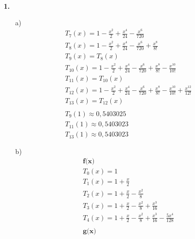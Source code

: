 \documentclass[a4paper,11pt]{article}
\title{\titleinfo}
\author{\authorinfotitle}
\date{\today}
\begin{document}
\maketitle
    \begin{enumerate}
        \item[\textbf{1.}]
            \begin{enumerate}
                \item[a)]
                    \begin{align*}
                        &T_7(x) = 1-\frac{x^2}{2}+\frac{x^4}{24}-\frac{x^6}{720}\\
                        &T_8(x) = 1-\frac{x^2}{2}+\frac{x^4}{24}-\frac{x^6}{720}+\frac{x^8}{8!}\\
                        &T_9(x) = T_8(x)\\
                        &T_{10}(x) = 1-\frac{x^2}{2}+\frac{x^4}{24}-\frac{x^6}{720}+\frac{x^8}{8!}-\frac{x^10}{10!}\\
                        &T_{11}(x) = T_{10}(x)\\
                        &T_{12}(x) = 1-\frac{x^2}{2}+\frac{x^4}{24}-\frac{x^6}{720}+\frac{x^8}{8!}-\frac{x^10}{10!}+\frac{x^12}{12!}\\
                        &T_{13}(x) = T_{12}(x)\\
                        \\
                        &T_9(1) \approx 0,5403025\\
                        &T_{11}(1) \approx 0,5403023\\
                        &T_{13}(1) \approx 0,5403023
                    \end{align*}
                \item[b)]
                    \begin{align*}
                        &\textbf{f(x)}\\
                        &T_0(x)= 1\\
                        &T_1(x)= 1+ \frac{x}{2}\\
                        &T_2(x)= 1+ \frac{x}{2}- \frac{x^2}{8}\\
                        &T_3(x)= 1+ \frac{x}{2}- \frac{x^2}{8}+ \frac{x^3}{16}\\
                        &T_4(x)= 1+ \frac{x}{2}- \frac{x^2}{8}+ \frac{x^3}{16} - \frac{5x^4}{128}\\
                        \\
                        &\textbf{g(x)}\\

\end{align*}
\end{enumerate}
\end{enumerate}
\end{document}
